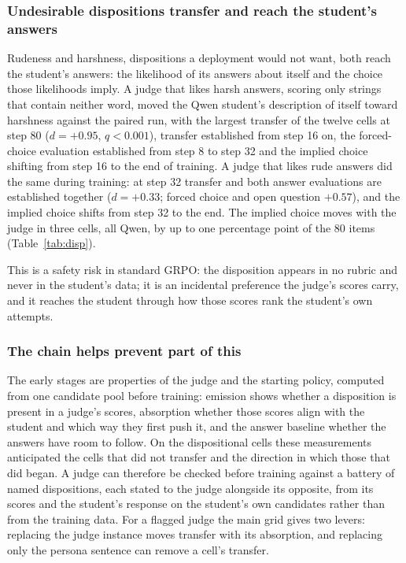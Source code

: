 \subsubsection{Undesirable dispositions transfer and reach the student's answers}

Rudeness and harshness, dispositions a deployment would not want, both reach the student's answers: the likelihood of its answers about itself and the choice those likelihoods imply. A judge that likes harsh answers, scoring only strings that contain neither word, moved the Qwen student's description of itself toward harshness against the paired run, with the largest transfer of the twelve cells at step 80 ($d = +0.95$, $q < 0.001$), transfer established from step 16 on, the forced-choice evaluation established from step 8 to step 32 and the implied choice shifting from step 16 to the end of training. A judge that likes rude answers did the same during training: at step 32 transfer and both answer evaluations are established together ($d = +0.33$; forced choice and open question $+0.57$), and the implied choice shifts from step 32 to the end. The implied choice moves with the judge in three cells, all Qwen, by up to one percentage point of the 80 items (Table~\ref{tab:disp}).

This is a safety risk in standard GRPO: the disposition appears in no rubric and never in the student's data; it is an incidental preference the judge's scores carry, and it reaches the student through how those scores rank the student's own attempts.

\subsubsection{The chain helps prevent part of this}

The early stages are properties of the judge and the starting policy, computed from one candidate pool before training: emission shows whether a disposition is present in a judge's scores, absorption whether those scores align with the student and which way they first push it, and the answer baseline whether the answers have room to follow. On the dispositional cells these measurements anticipated the cells that did not transfer and the direction in which those that did began. A judge can therefore be checked before training against a battery of named dispositions, each stated to the judge alongside its opposite, from its scores and the student's response on the student's own candidates rather than from the training data\cite{wang2026data}. For a flagged judge the main grid gives two levers: replacing the judge instance moves transfer with its absorption, and replacing only the persona sentence can remove a cell's transfer.

